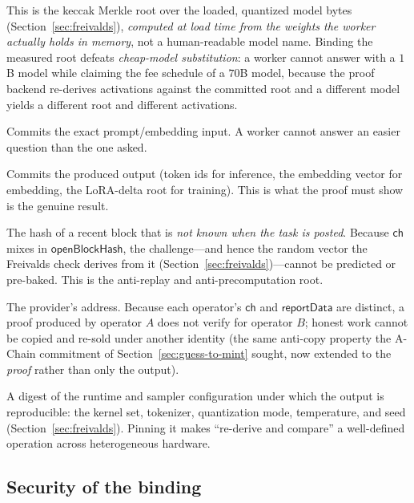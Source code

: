 \begin{description}[leftmargin=0pt,style=nextline]
\item[$\mathsf{modelSpecHash}$ --- a \emph{measured} weights Merkle root, not a
label.] This is the keccak Merkle root over the loaded, quantized model bytes
(Section~\ref{sec:freivalds}), \emph{computed at load time from the weights the
worker actually holds in memory}, not a human-readable model name. Binding the
measured root defeats \emph{cheap-model substitution}: a worker cannot answer with
a $1$B model while claiming the fee schedule of a $70$B model, because the proof
backend re-derives activations against the committed root and a different model
yields a different root and different activations.
\item[$\mathsf{inputHash}$.] Commits the exact prompt/embedding input. A worker
cannot answer an easier question than the one asked.
\item[$\mathsf{outputHash}$.] Commits the produced output (token ids for
inference, the embedding vector for embedding, the LoRA-delta root for training).
This is what the proof must show is the genuine result.
\item[$\mathsf{openBlockHash}$ --- the unpredictability beacon.] The hash of a
recent block that is \emph{not known when the task is posted}. Because $\mathsf{ch}$
mixes in $\mathsf{openBlockHash}$, the challenge---and hence the random vector the
Freivalds check derives from it (Section~\ref{sec:freivalds})---cannot be predicted
or pre-baked. This is the anti-replay and anti-precomputation root.
\item[$\mathsf{operator}$ --- per-operator domain.] The provider's address.
Because each operator's $\mathsf{ch}$ and $\mathsf{reportData}$ are distinct, a
proof produced by operator $A$ does not verify for operator $B$; honest work cannot
be copied and re-sold under another identity (the same anti-copy property the
A-Chain commitment of Section~\ref{sec:guess-to-mint} sought, now extended to the
\emph{proof} rather than only the output).
\item[$\mathsf{runtimeMeasurement}$ --- the determinism pin.] A digest of the
runtime and sampler configuration under which the output is reproducible: the
kernel set, tokenizer, quantization mode, temperature, and seed
(Section~\ref{sec:freivalds}). Pinning it makes ``re-derive and compare'' a
well-defined operation across heterogeneous hardware.
\end{description}

\subsection{Security of the binding}

